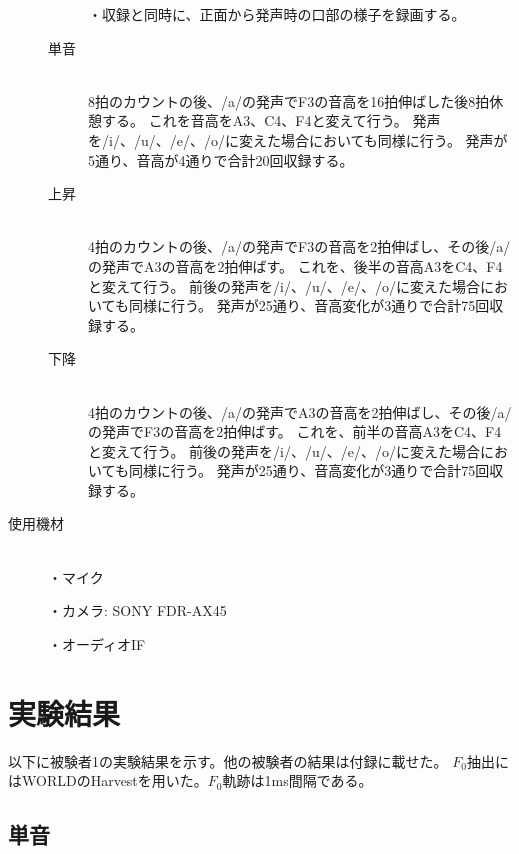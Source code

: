 \documentclass[10.5ptj,a4j,dvipdfmx,uplatex, oneside, openany]{jsbook}%
\begin{document}
\begin{description}
\begin{description}
                ・収録と同時に、正面から発声時の口部の様子を録画する。
            \item[単音]\mbox{}\\
                8拍のカウントの後、/a/の発声でF3の音高を16拍伸ばした後8拍休憩する。
                これを音高をA3、C4、F4と変えて行う。
                発声を/i/、/u/、/e/、/o/に変えた場合においても同様に行う。
                発声が5通り、音高が4通りで合計20回収録する。
            \item[上昇]\mbox{}\\
                4拍のカウントの後、/a/の発声でF3の音高を2拍伸ばし、その後/a/の発声でA3の音高を2拍伸ばす。
                これを、後半の音高A3をC4、F4と変えて行う。
                前後の発声を/i/、/u/、/e/、/o/に変えた場合においても同様に行う。
                発声が25通り、音高変化が3通りで合計75回収録する。
            \item[下降]\mbox{}\\
                4拍のカウントの後、/a/の発声でA3の音高を2拍伸ばし、その後/a/の発声でF3の音高を2拍伸ばす。
                これを、前半の音高A3をC4、F4と変えて行う。
                前後の発声を/i/、/u/、/e/、/o/に変えた場合においても同様に行う。
                発声が25通り、音高変化が3通りで合計75回収録する。
        \end{description}

    \item[使用機材]\mbox{}\\
        ・マイク

        ・カメラ: SONY FDR-AX45

        ・オーディオIF
\end{description}

\section{実験結果}
以下に被験者1の実験結果を示す。他の被験者の結果は付録に載せた。
$F_0$抽出にはWORLDのHarvestを用いた。$F_0$軌跡は1ms間隔である。


\subsection{単音}
\end{document}
